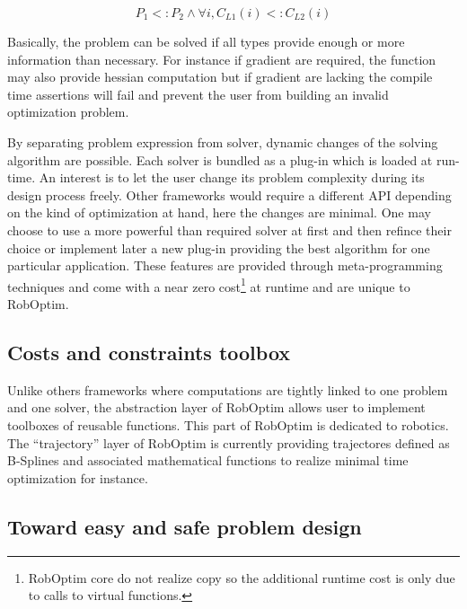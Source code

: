 \documentclass[conference,final,a4paper,twocolumn,9pt]{IEEEtran}
\begin{document}
\begin{equation}
  P_1 <: P_2 \wedge \forall i, C_{L1}(i) <: C_{L2}(i)
\end{equation}


Basically, the problem can be solved if all types provide enough or
more information than necessary. For instance if gradient are
required, the function may also provide hessian computation but if
gradient are lacking the compile time assertions will fail and prevent
the user from building an invalid optimization problem.

By separating problem expression from solver, dynamic changes of the
solving algorithm are possible. Each solver is bundled as a plug-in
which is loaded at run-time. An interest is to let the user change its
problem complexity during its design process freely. Other frameworks
would require a different API depending on the kind of optimization at
hand, here the changes are minimal. One may choose to use a more
powerful than required solver at first and then refince their choice
or implement later a new plug-in providing the best algorithm for one
particular application. These features are provided through
meta-programming techniques and come with a near zero
cost\footnote{RobOptim core do not realize copy so the additional
  runtime cost is only due to calls to virtual functions.} at runtime
and are unique to RobOptim.

\subsection{Costs and constraints toolbox}


Unlike others frameworks where computations are tightly linked to one
problem and one solver, the abstraction layer of RobOptim allows user
to implement toolboxes of reusable functions. This part of RobOptim is
dedicated to robotics. The ``trajectory'' layer of RobOptim is
currently providing trajectores defined as B-Splines and associated
mathematical functions to realize minimal time optimization for
instance.


\subsection{Toward easy and safe problem design}
\end{document}
